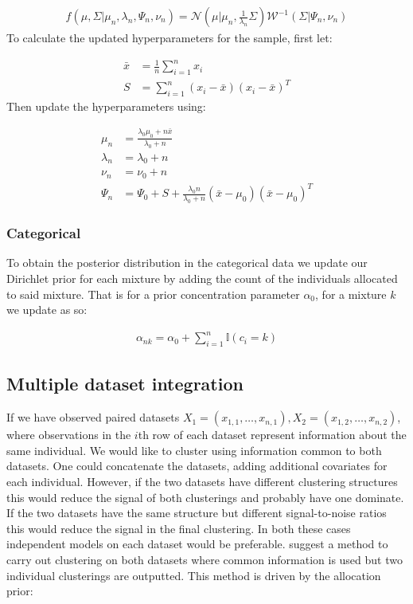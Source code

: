 \documentclass[11pt]{article} %
\begin{document}
\begin{align}
f(\mu, \Sigma | \mu_n, \lambda_n, \Psi_n, \nu_n) = \mathcal{N}\left(\mu | \mu_n, \frac{1}{\lambda_n}\Sigma\right)\mathcal{W}^{-1}\left(\Sigma | \Psi_n, \nu_n \right)
\end{align}
To calculate the updated hyperparameters for the sample, first let:

\begin{align}
\bar{x} &= \frac{1}{n}\sum_{i=1}^n x_i \\
S &= \sum_{i=1}^n (x_i - \bar{x})(x_i - \bar{x})^T
\end{align}
Then update the hyperparameters using:

\begin{align}
\mu_n &= \frac{\lambda_0 \mu_0 + n \bar{x}}{\lambda_0 + n} \\
\lambda_n &= \lambda_0 + n \\
\nu_n &= \nu_0 + n \\
\Psi_n &= \Psi_0 + S + \frac{\lambda_0 n}{\lambda_0 + n}(\bar{x} - \mu_0) (\bar{x} - \mu_0)^T
\end{align}

\subsubsection{Categorical}
To obtain the posterior distribution in the categorical data we update our Dirichlet prior for each mixture by adding the count of the individuals allocated to said mixture. That is for a prior concentration parameter $\alpha_0$, for a mixture $k$ we update as so:

\begin{align}
\alpha_{nk} = \alpha_0 + \sum_{i=1}^n \mathbb{I}(c_i = k)
\end{align}

\subsection{Multiple dataset integration}
If we have observed paired datasets $X_1 = (x_{1,1},\ldots,x_{n,1}), X_2 = (x_{1,2},\ldots,x_{n,2})$, where observations in the $i$th row of each dataset represent information about the same individual. We would like to cluster using information common to both datasets. One could concatenate the datasets, adding additional covariates for each individual. However, if the two datasets have different clustering structures this would reduce the signal of both clusterings and probably have one dominate. If the two datasets have the same structure but different signal-to-noise ratios this would reduce the signal in the final clustering. In both these cases independent models on each dataset would be preferable. \citet{kirkBayesianCorrelatedClustering2012} suggest a method to carry out clustering on both datasets where common information is used but two individual clusterings are outputted. This method is driven by the allocation prior:
\end{document}
